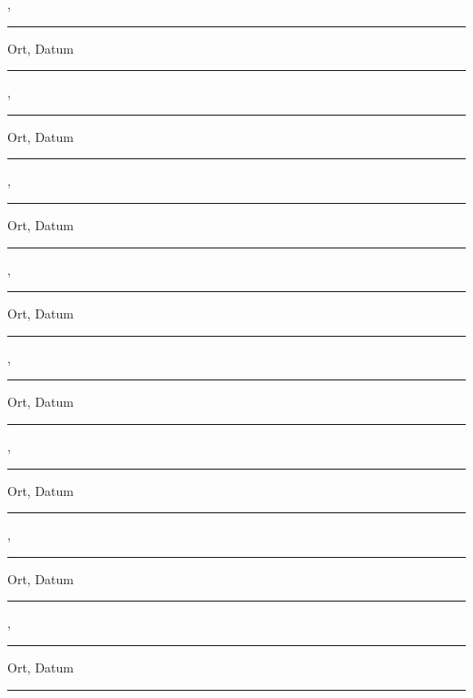 \vfill
\leavevmode
\newline
\parbox{7cm}{\strut\centering \vBearbeitungsort, \vAbgabedatum\hrule\strut\centering\footnotesize Ort, Datum} 
\hfill
\parbox{7cm}{\strut\hspace{1pt} \hrule\strut\centering\footnotesize \vJB}
\newline
\vspace{1cm}
\newline
\parbox{7cm}{\strut\centering \vBearbeitungsort, \vAbgabedatum\hrule\strut\centering\footnotesize Ort, Datum} 
\hfill
\parbox{7cm}{\strut\hspace{1pt} \hrule\strut\centering\footnotesize \vLB}
\newline
\vspace{1cm}
\newline
\parbox{7cm}{\strut\centering \vBearbeitungsort, \vAbgabedatum\hrule\strut\centering\footnotesize Ort, Datum} 
\hfill
\parbox{7cm}{\strut\hspace{1pt} \hrule\strut\centering\footnotesize \vDF}
\newline
\vspace{1cm}
\newline
\parbox{7cm}{\strut\centering \vBearbeitungsort, \vAbgabedatum\hrule\strut\centering\footnotesize Ort, Datum} 
\hfill
\parbox{7cm}{\strut\hspace{1pt} \hrule\strut\centering\footnotesize \vFG}
\newline
\vspace{1cm}
\newline
\parbox{7cm}{\strut\centering \vBearbeitungsort, \vAbgabedatum\hrule\strut\centering\footnotesize Ort, Datum} 
\hfill
\parbox{7cm}{\strut\hspace{1pt} \hrule\strut\centering\footnotesize \vFH}
\newline
\vspace{1cm}
\newline
\parbox{7cm}{\strut\centering \vBearbeitungsort, \vAbgabedatum\hrule\strut\centering\footnotesize Ort, Datum} 
\hfill
\parbox{7cm}{\strut\hspace{1pt} \hrule\strut\centering\footnotesize \vPP}
\newline
\vspace{1cm}
\newline
\parbox{7cm}{\strut\centering \vBearbeitungsort, \vAbgabedatum\hrule\strut\centering\footnotesize Ort, Datum} 
\hfill
\parbox{7cm}{\strut\hspace{1pt} \hrule\strut\centering\footnotesize \vHS}
\newline
\vspace{1cm}
\newline
\parbox{7cm}{\strut\centering \vBearbeitungsort, \vAbgabedatum\hrule\strut\centering\footnotesize Ort, Datum} 
\hfill
\parbox{7cm}{\strut\hspace{1pt} \hrule\strut\centering\footnotesize \vBS}
\newpage